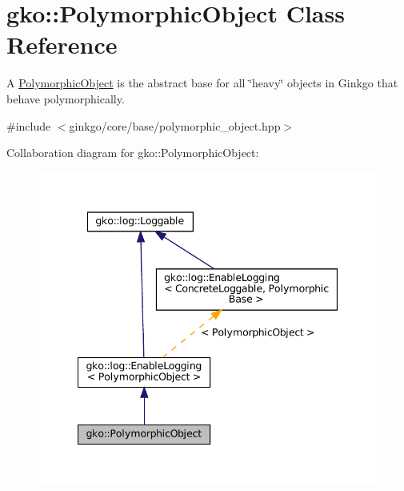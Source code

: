 \hypertarget{classgko_1_1PolymorphicObject}{}\section{gko\+:\+:Polymorphic\+Object Class Reference}
\label{classgko_1_1PolymorphicObject}


A \hyperlink{classgko_1_1PolymorphicObject}{Polymorphic\+Object} is the abstract base for all \char`\"{}heavy\char`\"{} objects in Ginkgo that behave polymorphically.  




{\ttfamily \#include $<$ginkgo/core/base/polymorphic\+\_\+object.\+hpp$>$}



Collaboration diagram for gko\+:\+:Polymorphic\+Object\+:
\nopagebreak
\begin{figure}[H]
\begin{center}
\leavevmode
\includegraphics[width=341pt]{classgko_1_1PolymorphicObject__coll__graph}
\end{center}
\end{figure}
